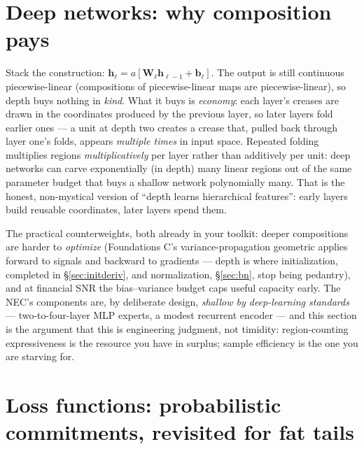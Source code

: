 \documentclass[11pt]{article}
\numberwithin{equation}{section}
\theoremstyle{plain}
\theoremstyle{definition}
\theoremstyle{remark}
\newcommand{\bh}{\bm{h}}
\newcommand{\bW}{\bm{W}}
\newcommand{\bb}{\bm{b}}
\begin{document}
\section{Deep networks: why composition pays}\label{sec:deep}

Stack the construction: $\bh_\ell = a[\bW_\ell \bh_{\ell-1} + \bb_\ell]$. The output is still continuous piecewise-linear (compositions of piecewise-linear maps are piecewise-linear), so depth buys nothing in \emph{kind}. What it buys is \emph{economy}: each layer's creases are drawn in the coordinates produced by the previous layer, so later layers fold earlier ones --- a unit at depth two creates a crease that, pulled back through layer one's folds, appears \emph{multiple times} in input space. Repeated folding multiplies regions \emph{multiplicatively} per layer rather than additively per unit: deep networks can carve exponentially (in depth) many linear regions out of the same parameter budget that buys a shallow network polynomially many. That is the honest, non-mystical version of ``depth learns hierarchical features'': early layers build reusable coordinates, later layers spend them.

The practical counterweights, both already in your toolkit: deeper compositions are harder to \emph{optimize} (Foundations C's variance-propagation geometric applies forward to signals and backward to gradients --- depth is where initialization, completed in \S\ref{sec:initderiv}, and normalization, \S\ref{sec:bn}, stop being pedantry), and at financial SNR the bias--variance budget caps useful capacity early. The NEC's components are, by deliberate design, \emph{shallow by deep-learning standards} --- two-to-four-layer MLP experts, a modest recurrent encoder --- and this section is the argument that this is engineering judgment, not timidity: region-counting expressiveness is the resource you have in surplus; sample efficiency is the one you are starving for.

\section{Loss functions: probabilistic commitments, revisited for fat tails}\label{sec:loss}
\end{document}
